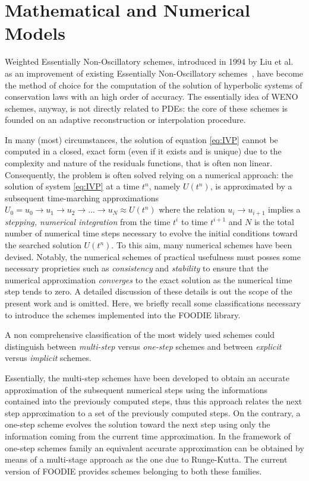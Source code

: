 \section{Mathematical and Numerical Models}\label{sec:MNmodels}

Weighted Essentially Non-Oscillatory schemes, introduced in 1994 by Liu et al.~\cite{liu-1994} as an improvement of existing Essentially Non-Oscillatory schemes~\cite{harten-1987}, have become the method of choice for the computation of the solution of hyperbolic systems of conservation laws with an high order of accuracy. The essentially idea of WENO schemes, anyway, is not directly related to PDEs: the core of these schemes is founded on an adaptive reconstruction or interpolation procedure.

In many (most) circumstances, the solution of equation \ref{eq:IVP} cannot be computed in a closed, exact form (even if it exists and is unique) due to the complexity and nature of the residuals functions, that is often non linear. Consequently, the problem is often solved relying on a numerical approach: the solution of system \ref{eq:IVP} at a time $t^n$, namely $U(t^n)$, is approximated by a subsequent time-marching approximations $U_0=u_0 \rightarrow u_1 \rightarrow u_2 \rightarrow ... \rightarrow u_N\approx U(t^n)$ where the relation $u_i \rightarrow u_{i+1}$ implies a \emph{stepping, numerical integration} from the time $t^i$ to time $t^{i+1}$ and $N$ is the total number of numerical time steps necessary to evolve the initial conditions toward the searched solution $U(t^n)$. To this aim, many numerical schemes have been devised. Notably, the numerical schemes of practical usefulness must posses some necessary proprieties such as \emph{consistency} and \emph{stability} to ensure that the numerical approximation \emph{converges} to the exact solution as the numerical time step tends to zero. A detailed discussion of these details is out the scope of the present work and is omitted. Here, we briefly recall some classifications necessary to introduce the schemes implemented into the FOODIE library.

A non comprehensive classification of the most widely used schemes could distinguish between \emph{multi-step} versus \emph{one-step} schemes and between \emph{explicit} versus \emph{implicit} schemes.

Essentially, the multi-step schemes have been developed to obtain an accurate approximation of the subsequent numerical steps using the informations contained into the previously computed steps, thus this approach relates the next step approximation to a set of the previously computed steps. On the contrary, a one-step scheme evolves the solution toward the next step using only the information coming from the current time approximation. In the framework of one-step schemes family an equivalent accurate approximation can be obtained by means of a multi-stage approach as the one due to Runge-Kutta. The current version of FOODIE provides schemes belonging to both these families.

